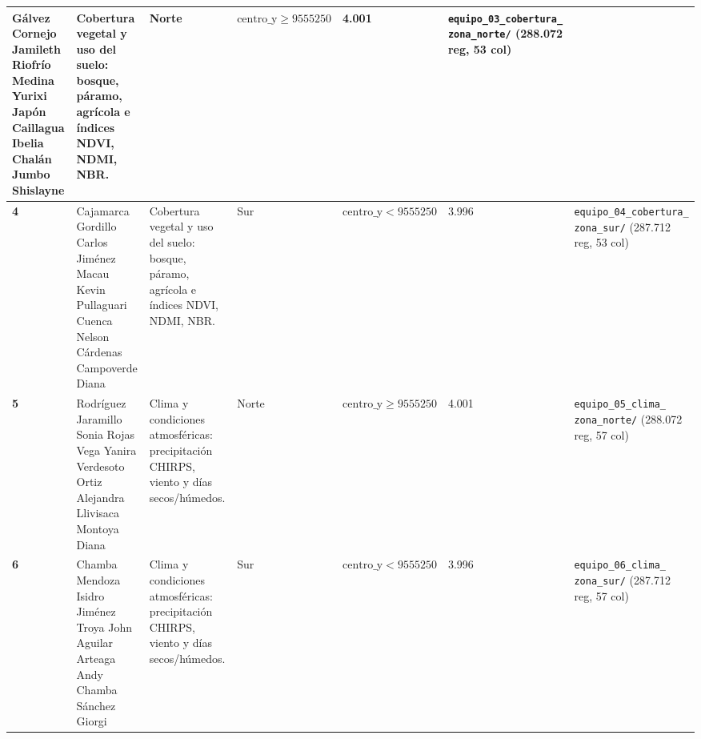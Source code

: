 \documentclass[11pt,a4paper]{article}
\begin{document}
\begin{table}[h!]
\begin{tabularx}{\textwidth}{C{0.8cm} L{3.5cm} L{3.3cm} C{1.1cm} C{1.8cm} C{1.1cm} Y}
\textbullet{} Gálvez Cornejo Jamileth\newline
\textbullet{} Riofrío Medina Yurixi\newline
\textbullet{} Japón Caillagua Ibelia\newline
\textbullet{} Chalán Jumbo Shislayne & 
Cobertura vegetal y uso del suelo: bosque, páramo, agrícola e índices NDVI, NDMI, NBR. & 
Norte & 
$\text{centro\_y} \ge 9555250$ & 
4.001 & 
\texttt{equipo\_03\_cobertura\_} \newline \texttt{zona\_norte/} \newline (288.072 reg, 53 col) \\
\midrule
\textbf{4} & 
\textbullet{} Cajamarca Gordillo Carlos\newline
\textbullet{} Jiménez Macau Kevin\newline
\textbullet{} Pullaguari Cuenca Nelson\newline
\textbullet{} Cárdenas Campoverde Diana & 
Cobertura vegetal y uso del suelo: bosque, páramo, agrícola e índices NDVI, NDMI, NBR. & 
Sur & 
$\text{centro\_y} < 9555250$ & 
3.996 & 
\texttt{equipo\_04\_cobertura\_} \newline \texttt{zona\_sur/} \newline (287.712 reg, 53 col) \\
\midrule
\textbf{5} & 
\textbullet{} Rodríguez Jaramillo Sonia\newline
\textbullet{} Rojas Vega Yanira\newline
\textbullet{} Verdesoto Ortiz Alejandra\newline
\textbullet{} Llivisaca Montoya Diana & 
Clima y condiciones atmosféricas: precipitación CHIRPS, viento y días secos/húmedos. & 
Norte & 
$\text{centro\_y} \ge 9555250$ & 
4.001 & 
\texttt{equipo\_05\_clima\_} \newline \texttt{zona\_norte/} \newline (288.072 reg, 57 col) \\
\midrule
\textbf{6} & 
\textbullet{} Chamba Mendoza Isidro\newline
\textbullet{} Jiménez Troya John\newline
\textbullet{} Aguilar Arteaga Andy\newline
\textbullet{} Chamba Sánchez Giorgi & 
Clima y condiciones atmosféricas: precipitación CHIRPS, viento y días secos/húmedos. & 
Sur & 
$\text{centro\_y} < 9555250$ & 
3.996 & 
\texttt{equipo\_06\_clima\_} \newline \texttt{zona\_sur/} \newline (287.712 reg, 57 col) \\

\end{tabularx}
\end{table}
\end{document}
